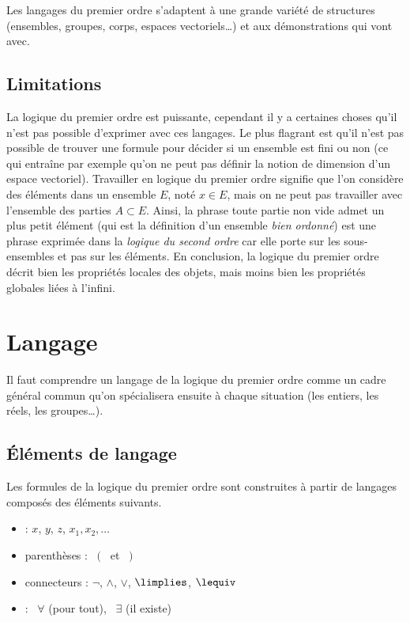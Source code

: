 \documentclass[11pt,class=report,crop=false]{standalone}
\begin{document}
Les langages du premier ordre s'adaptent à une grande variété de structures (ensembles, groupes, corps, espaces vectoriels\ldots) et aux démonstrations qui vont avec.


\subsection{Limitations}

La logique du premier ordre est puissante, cependant il y a certaines choses qu'il n'est pas possible d'exprimer avec ces langages. Le plus flagrant est qu'il n'est pas possible de trouver une formule pour décider si un ensemble est fini ou non (ce qui entraîne par exemple qu'on ne peut pas définir la notion de dimension d'un espace vectoriel). 
Travailler en logique du premier ordre signifie que l'on considère des éléments dans un ensemble $E$, noté \og{}$x \in E$\fg{}, mais on ne peut pas travailler avec l'ensemble des parties $A \subset E$. 
Ainsi, la phrase \og{}toute partie non vide admet un plus petit élément\fg{} (qui est la définition d'un ensemble \emph{bien ordonné}) est une phrase exprimée dans la \emph{logique du second ordre} car elle porte sur les sous-ensembles et pas sur les éléments.
En conclusion, la logique du premier ordre décrit bien les propriétés locales des objets, mais moins bien les propriétés globales liées à l'infini.



\section{Langage}

Il faut comprendre un langage de la logique du premier ordre comme un cadre général commun qu'on spécialisera ensuite à chaque situation (les entiers, les réels, les groupes\ldots).

\subsection{Éléments de langage}

Les formules de la logique du premier ordre sont construites à partir de langages composés des éléments suivants.

\begin{itemize}
	\item {} : $x$, $y$, $z$, $x_1,x_2,\ldots$
	
	\item parenthèses : \ $($ \ et \ $)$
	
	\item connecteurs : $\lnot$, $\land$, $\lor$, $\limplies$, $\lequiv$
	
	\item {} : \ $\forall$ (pour tout), \ $\exists$ (il existe)
\end{itemize}
\end{document}

